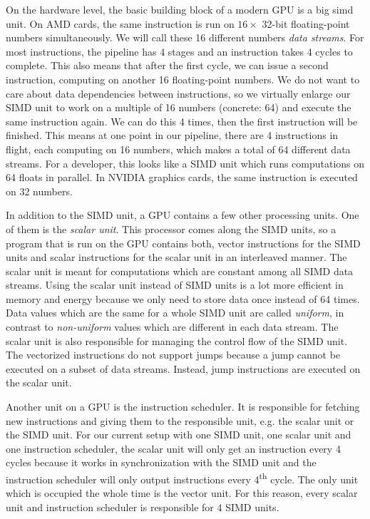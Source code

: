 On the hardware level, the basic building block of a modern GPU is a big \gls{simd} unit. On AMD cards, the same instruction is run on $16 \times$ 32-bit floating-point numbers simultaneously. We will call these 16 different numbers \emph{data streams}. For most instructions, the pipeline has 4 stages and an instruction takes 4 cycles to complete. This also means that after the first cycle, we can issue a second instruction, computing on another 16 floating-point numbers. We do not want to care about data dependencies between instructions, so we virtually enlarge our SIMD unit to work on a multiple of 16 numbers (concrete: 64) and execute the same instruction again. We can do this 4 times, then the first instruction will be finished. This means at one point in our pipeline, there are 4 instructions in flight, each computing on 16 numbers, which makes a total of 64 different data streams. For a developer, this looks like a SIMD unit which runs computations on 64 floats in parallel. In NVIDIA graphics cards, the same instruction is executed on 32 numbers.

In addition to the SIMD unit, a GPU contains a few other processing units. One of them is the \emph{scalar unit}. This processor comes along the SIMD units, so a program that is run on the GPU contains both, vector instructions for the SIMD units and scalar instructions for the scalar unit in an interleaved manner. The scalar unit is meant for computations which are constant among all SIMD data streams. Using the scalar unit instead of SIMD units is a lot more efficient in memory and energy because we only need to store data once instead of 64 times. Data values which are the same for a whole SIMD unit are called \emph{uniform}, in contrast to \emph{non-uniform} values which are different in each data stream. The scalar unit is also responsible for managing the control flow of the SIMD unit. The vectorized instructions do not support jumps because a jump cannot be executed on a subset of data streams. Instead, jump instructions are executed on the scalar unit.

Another unit on a GPU is the instruction scheduler. It is responsible for fetching new instructions and giving them to the responsible unit, e.g. the scalar unit or the SIMD unit. For our current setup with one SIMD unit, one scalar unit and one instruction scheduler, the scalar unit will only get an instruction every 4 cycles because it works in synchronization with the SIMD unit and the instruction scheduler will only output instructions every 4\textsuperscript{th} cycle. The only unit which is occupied the whole time is the vector unit. For this reason, every scalar unit and instruction scheduler is responsible for 4 SIMD units.

